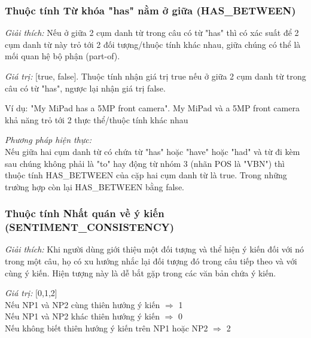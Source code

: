 \documentclass[12pt]{extarticle}
\begin{document}
			\subsubsection*{Thuộc tính Từ khóa "has" nằm ở giữa (HAS\_BETWEEN)}
				\par \textit{Giải thích:} Nếu ở giữa 2 cụm danh từ trong câu có từ "has" thì có xác suất để 2 cụm danh từ này trỏ tới 2 đối tượng/thuộc tính khác nhau, giữa chúng có thể là mối quan hệ bộ phận (part-of). 
				\par \textit{Giá trị:} [true, false]. Thuộc tính nhận giá trị true nếu ở giữa 2 cụm danh từ trong câu có từ "has", ngược lại nhận giá trị false.
				\par Ví dụ:
				"My MiPad has a 5MP front camera". My MiPad và a 5MP front camera khả năng trỏ tới 2 thực thể/thuộc tính khác nhau
								
				\par \textit{Phương pháp hiện thực:}
				\\Nếu giữa hai cụm danh từ có chứa từ "has" hoặc "have" hoặc "had" và từ đi kèm sau chúng không phải là "to" hay động từ nhóm 3 (nhãn POS là "VBN") thì thuộc tính HAS\_BETWEEN của cặp hai cụm danh từ là true. Trong những trường hợp còn lại HAS\_BETWEEN bằng false.

			\subsubsection*{Thuộc tính Nhất quán về ý kiến (SENTIMENT\_CONSISTENCY)}
				\par \textit{Giải thích:} Khi người dùng giới thiệu một đối tượng và thể hiện ý kiến đối với nó trong một câu, họ có xu hướng nhắc lại đối tượng đó trong câu tiếp theo và với cùng ý kiến. Hiện tượng này là dễ bắt gặp trong các văn bản chứa ý kiến.
				\par \textit{Giá trị:} [0,1,2]
				\\Nếu NP1 và NP2 cùng thiên hướng ý kiến $\Rightarrow$ 1
				\\Nếu NP1 và NP2 khác thiên hướng ý kiến $\Rightarrow$ 0
				\\Nếu không biết thiên hướng ý kiến trên NP1 hoặc NP2 $\Rightarrow$ 2
\end{document}

